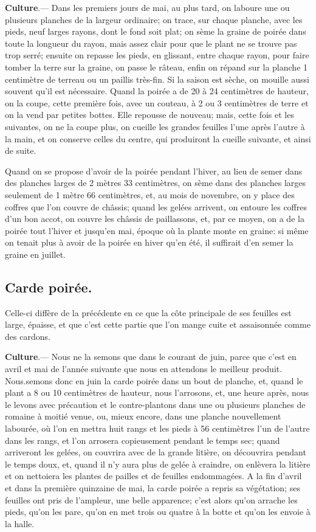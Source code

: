 \documentclass[10pt,a4paper]{book}
\begin{document}
\textbf{Culture}.--- Dans les premiers jours de mai, au plus tard, on laboure une ou plusieurs planches de la largeur ordinaire; on trace, sur chaque planche, avec les pieds, neuf larges rayons, dont le fond soit plat; on sème la graine de poirée dans toute la longueur du rayon, mais assez clair pour que le plant ne se trouve pas trop serré; ensuite on repasse les pieds, en glissant, entre chaque rayon, pour faire tomber la terre sur la graine, on passe le râteau, enfin on répand sur la planche 1 centimètre de terreau ou un paillis très-fin. Si la saison est sèche, on mouille aussi souvent qu'il est nécessaire. Quand la poirée a de 20 à 24 centimètres de hauteur, on la coupe, cette première fois, avec un couteau, à 2 ou 3 centimètres de terre et on la vend par petites bottes. Elle repousse de nouveau; mais, cette fois et les suivantes, on ne la coupe plus, on cueille les grandes feuilles l'une après l'autre à la main, et on conserve celles du centre, qui produiront la cueille suivante, et ainsi de suite.

Quand on se propose d'avoir de la poirée pendant l'hiver, au lieu de semer dans des planches larges de 2 mètres 33 centimètres, on sème dans des planches larges seulement de 1 mètre 66 centimètres, et, au mois de novembre, on y place des coffres que l'on couvre de châssis; quand les gelées arrivent, on entoure les coffres d'un bon accot, on couvre les châssis de paillassons, et, par ce moyen, on a de la poirée tout l'hiver et jusqu'en mai, époque où la plante monte en graine: si même on tenait plus à avoir de la poirée en hiver qu'en été, il suffirait d'en semer la graine en juillet.

\subsection{Carde poirée.}

Celle-ci diffère de la précédente en ce que la côte principale de ses feuilles est large, épaisse, et que c'est cette partie que l'on mange cuite et assaisonnée comme des cardons.

\textbf{Culture}.--- Nous ne la semons que dans le courant de juin, parce que c'est en avril et mai de l'année suivante que nous en attendons le meilleur produit. Nous.semons donc en juin la carde poirée dans un bout de planche, et, quand le plant a 8 ou 10 centimètres de hauteur, nous l'arrosons, et, une heure après, nous le levons avec précaution et le contre-plantons dans une ou plusieurs planches de romaine à moitié venue, ou, mieux encore, dans une planche nouvellement labourée, où l'on en mettra huit rangs et les pieds à 56 centimètres l'un de l'autre dans les rangs, et l'on arrosera copieusement pendant le temps sec; quand arriveront les gelées, on couvrira avec de la grande litière, on découvrira pendant le temps doux, et, quand il n'y aura plus de gelée à craindre, on enlèvera la litière et on nettoiera les plantes de pailles et de feuilles endommagées. A la fin d'avril et dans la première quinzaine de mai, la carde poirée a repris sa végétation; ses feuilles ont pris de l'ampleur, une belle apparence; c'est alors qu'on arrache les pieds, qu'on les pare, qu'on en met trois ou quatre à la botte et qu'on les envoie à la halle.
\end{document}

